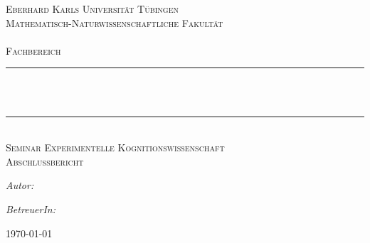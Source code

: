 \begin{titlepage}

\begin{center}
  

\textsc{\LARGE  Eberhard Karls Universität Tübingen\\Mathematisch-Naturwissenschaftliche Fakultät\\ \institut\\
Fachbereich \fachbereich}\\[4cm]


\newcommand{\HRule}{\rule{\linewidth}{0.5mm}}
\HRule \\[0.4cm]
\vspace{0.4cm}
{ \huge \bfseries \titel}\\[0.4cm]

\HRule \\[1cm]

\textsc{\Large Seminar Experimentelle Kognitionswissenschaft\\ Abschlussbericht}\\[0.5cm]

\vspace{4cm}
\begin{minipage}{0.4\textwidth}
\begin{flushleft} \large
\emph{Autor:}\\
\vorname \space\textsc{\name}
\end{flushleft}
\end{minipage}
\hfill
\begin{minipage}{0.4\textwidth}
\begin{flushright} \large
\emph{BetreuerIn:} \\
\betreuerIn
\end{flushright}
\end{minipage}

\vfill

{\large \today}

\end{center}

\end{titlepage}
